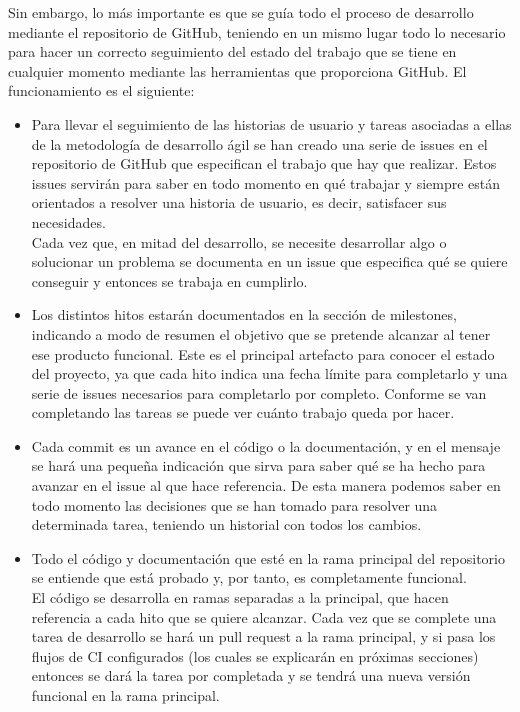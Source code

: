 Sin embargo, lo más importante es que se guía todo el proceso de desarrollo mediante el repositorio de GitHub, teniendo en un mismo lugar todo lo necesario para hacer un correcto seguimiento del estado del trabajo que se tiene en cualquier momento mediante las herramientas que proporciona GitHub. El funcionamiento es el siguiente:
\begin{itemize}
    \item Para llevar el seguimiento de las historias de usuario y tareas asociadas a ellas de la metodología de desarrollo ágil se han creado una serie de issues en el repositorio de GitHub que especifican el trabajo que hay que realizar. Estos issues servirán para saber en todo momento en qué trabajar y siempre están orientados a resolver una historia de usuario, es decir, satisfacer sus necesidades.\\
    Cada vez que, en mitad del desarrollo, se necesite desarrollar algo o solucionar un problema se documenta en un issue que especifica qué se quiere conseguir y entonces se trabaja en cumplirlo.
    \item Los distintos hitos estarán documentados en la sección de milestones, indicando a modo de resumen el objetivo que se pretende alcanzar al tener ese producto funcional. Este es el principal artefacto para conocer el estado del proyecto, ya que cada hito indica una fecha límite para completarlo y una serie de issues necesarios para completarlo por completo. Conforme se van completando las tareas se puede ver cuánto trabajo queda por hacer.
    \item Cada commit es un avance en el código o la documentación, y en el mensaje se hará una pequeña indicación que sirva para saber qué se ha hecho para avanzar en el issue al que hace referencia. De esta manera podemos saber en todo momento las decisiones que se han tomado para resolver una determinada tarea, teniendo un historial con todos los cambios.
    \item Todo el código y documentación que esté en la rama principal del repositorio se entiende que está probado y, por tanto, es completamente funcional. \\
    El código se desarrolla en ramas separadas a la principal, que hacen referencia a cada hito que se quiere alcanzar. Cada vez que se complete una tarea de desarrollo se hará un pull request a la rama principal, y si pasa los flujos de CI configurados (los cuales se explicarán en próximas secciones) entonces se dará la tarea por completada y se tendrá una nueva versión funcional en la rama principal. 
\end{itemize}

